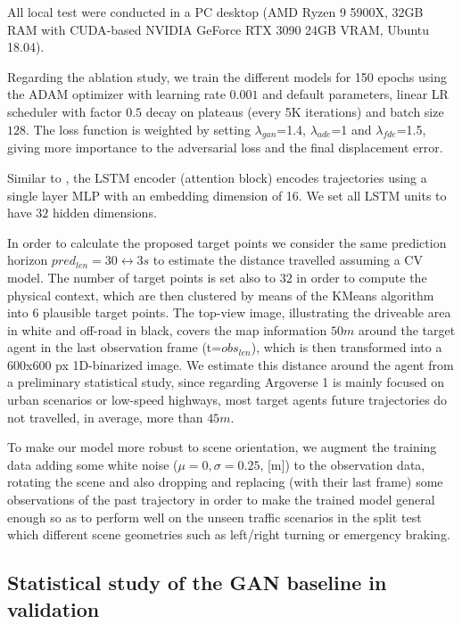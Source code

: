 All local test were conducted in a PC desktop (AMD Ryzen 9 5900X, 32GB RAM with \ac{CUDA}-based NVIDIA GeForce RTX 3090 24GB VRAM, Ubuntu 18.04).

Regarding the ablation study, we train the different models for 150 epochs using the \ac{ADAM} optimizer with learning rate $0.001$ and default parameters, linear \ac{LR} scheduler with factor $0.5$ decay on plateaus (every 5K iterations) and batch size $128$. The loss function is weighted by setting $\lambda_{gan}$=1.4, $\lambda_{ade}$=1 and $\lambda_{fde}$=1.5, giving more importance to the adversarial loss and the final displacement error. 

Similar to \cite{sadeghian2019sophie}, the \ac{LSTM} encoder (attention block) encodes trajectories using a single layer \ac{MLP} with an embedding dimension of 16. We set all \ac{LSTM} units to have $32$ hidden dimensions. 

In order to calculate the proposed target points we consider the same prediction horizon $pred_{len}=30 \longleftrightarrow 3s$ to estimate the distance travelled assuming a \ac{CV} model. The number of target points is set also to $32$ in order to compute the physical context, which are then clustered by means of the KMeans algorithm into $6$ plausible target points. The top-view image, illustrating the driveable area in white and off-road in black, covers the map information $50m$ around the target agent in the last observation frame (t=$obs_{len}$), which is then transformed into a 600x600 px 1D-binarized image. We estimate this distance around the agent from a preliminary statistical study, since regarding Argoverse 1 is mainly focused on urban scenarios or low-speed highways, most target agents future trajectories do not travelled, in average, more than $45m$.  

To make our model more robust to scene orientation, we augment the training data adding some white noise ($\mu=0, \sigma=0.25$, [m]) to the observation data, rotating the scene and also dropping and replacing (with their last frame) some observations of the past trajectory in order to make the trained model general enough so as to perform well on the unseen traffic scenarios in the split test which different scene geometries such as left/right turning or emergency braking.%

\subsection{Statistical study of the GAN baseline in validation}
\label{subsec:5_target_agent_distribution}


